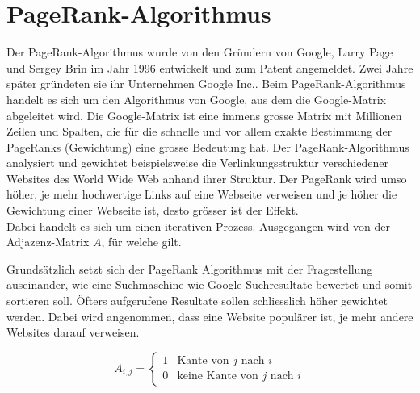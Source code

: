 \section{PageRank-Algorithmus}
Der PageRank-Algorithmus wurde von den Gründern von Google, Larry Page und Sergey Brin im Jahr 1996 entwickelt und zum Patent angemeldet. Zwei Jahre später gründeten sie ihr Unternehmen Google Inc..
Beim PageRank-Algorithmus handelt es sich um den Algorithmus von Google, aus dem die Google-Matrix abgeleitet wird.
Die Google-Matrix ist eine immens grosse Matrix mit Millionen Zeilen und Spalten, die für die schnelle und vor allem exakte Bestimmung der PageRanks (Gewichtung) eine grosse Bedeutung hat.
Der PageRank-Algorithmus analysiert und gewichtet beispielsweise die Verlinkungsstruktur verschiedener Websites des World Wide Web anhand ihrer Struktur.
Der PageRank wird umso höher, je mehr hochwertige Links auf eine Webseite verweisen und je höher die Gewichtung einer Webseite ist, desto grösser ist der Effekt.\\
Dabei handelt es sich um einen iterativen Prozess. Ausgegangen wird von der Adjazenz-Matrix $A$, für welche gilt.

Grundsätzlich setzt sich der PageRank Algorithmus mit der Fragestellung auseinander, wie eine Suchmaschine wie Google Suchresultate bewertet und somit sortieren soll. Öfters aufgerufene Resultate sollen schliesslich höher gewichtet werden. Dabei wird angenommen, dass eine Website populärer ist, je mehr andere Websites darauf verweisen.

\begin{equation}
A_{i,j}=\left\{ \begin{matrix}
1 & \text{Kante von $j$ nach $i$} \\ 0 & \text{keine Kante von $j$ nach $i$}
\end{matrix}
 \right.
\label{verkehr:Adja}
\end{equation}


